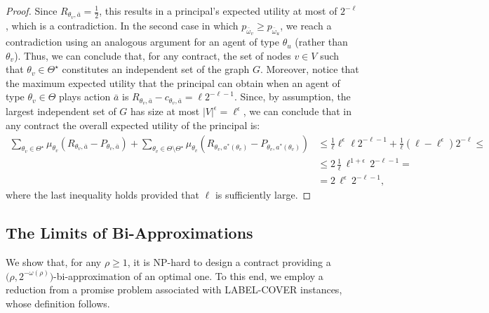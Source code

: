 \begin{proof}
	Since $R_{\theta_v, \bar a} = \frac{1}{2}$, this results in a principal's expected utility at most of $2^{-\ell}$, which is a contradiction.
	In the second case in which $p_{\bar \omega_v} \geq p_{\bar \omega_{u}}$, we reach a contradiction using an analogous argument for an agent of type $\theta_u$ (rather than $\theta_v$).
	Thus, we can conclude that, for any contract, the set of nodes $v \in V$ such that $\theta_v \in \Theta^\star$ constitutes an independent set of the graph $G$.
	Moreover, notice that the maximum expected utility that the principal can obtain when an agent of type $\theta_v \in \Theta$ plays action $\bar a$ is $R_{\theta_v, \bar a} - c_{\theta_v, \bar a} = \ell 2^{-\ell-1}$.
	Since, by assumption, the largest independent set of $G$ has size at most $|V|^\epsilon = \ell^\epsilon$, we can conclude that in any contract the overall expected utility of the principal is:
	\begin{align*}
		\sum_{\theta_v \in \Theta^\star} \mu_{\theta_v} \left( R_{\theta_v, \bar a} - P_{\theta_v, \bar a}  \right) + \sum_{\theta_v \in \Theta \setminus \Theta^\star} \mu_{\theta_v} \left( R_{\theta_v,  a^*(\theta_v)} - P_{\theta_v,  a^*(\theta_v)}  \right) & \leq  \frac{1}{\ell} \ell^\epsilon \ell 2^{-\ell-1} + \frac{1}{\ell} \left( \ell -\ell^\epsilon  \right) 2^{-\ell} \leq \\
		& \leq 2\,  \frac{1}{\ell} \, \ell^{1+\epsilon}  \, 2^{-\ell-1} = \\
		& = 2 \, \ell^\epsilon \, 2^{-\ell-1},
	\end{align*}
	where the last inequality holds provided that $\ell$ is sufficiently large.
\end{proof}




\subsection{The Limits of Bi-Approximations}\label{sec:hardness_bi_apx}

We show that, for any $\rho\ge 1$, it is \textnormal{\textsf{NP}}-hard to design a contract providing a $\big(\rho,2^{-\omega(\rho)} \big)$-bi-approximation of an optimal one.
%
To this end, we employ a reduction from a {promise problem} associated with \textsf{LABEL-COVER} instances, whose definition follows.

